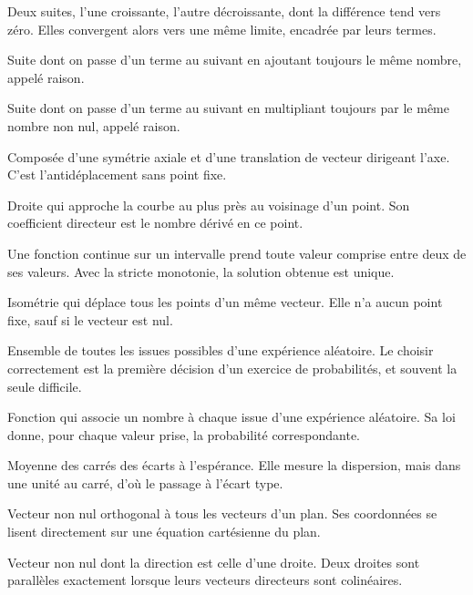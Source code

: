Deux suites, l'une croissante, l'autre décroissante, dont la différence tend
vers zéro. Elles convergent alors vers une même limite, encadrée par leurs
termes.

Suite dont on passe d'un terme au suivant en ajoutant toujours le même nombre,
appelé raison.

Suite dont on passe d'un terme au suivant en multipliant toujours par le même
nombre non nul, appelé raison.

Composée d'une symétrie axiale et d'une translation de vecteur dirigeant
l'axe. C'est l'antidéplacement sans point fixe.


Droite qui approche la courbe au plus près au voisinage d'un point. Son
coefficient directeur est le nombre dérivé en ce point.

Une fonction continue sur un intervalle prend toute valeur comprise entre deux
de ses valeurs. Avec la stricte monotonie, la solution obtenue est unique.

Isométrie qui déplace tous les points d'un même vecteur. Elle n'a aucun point
fixe, sauf si le vecteur est nul.


Ensemble de toutes les issues possibles d'une expérience aléatoire. Le choisir
correctement est la première décision d'un exercice de probabilités, et
souvent la seule difficile.


Fonction qui associe un nombre à chaque issue d'une expérience aléatoire. Sa
loi donne, pour chaque valeur prise, la probabilité correspondante.

Moyenne des carrés des écarts à l'espérance. Elle mesure la dispersion, mais
dans une unité au carré, d'où le passage à l'écart type.

Vecteur non nul orthogonal à tous les vecteurs d'un plan. Ses coordonnées se
lisent directement sur une équation cartésienne du plan.

Vecteur non nul dont la direction est celle d'une droite. Deux droites sont
parallèles exactement lorsque leurs vecteurs directeurs sont colinéaires.
